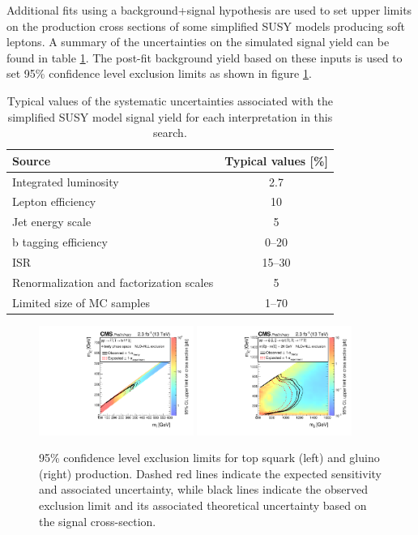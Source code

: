 Additional fits using a background+signal hypothesis are used to set upper limits on the production cross sections of some simplified SUSY models producing soft leptons. A summary of the uncertainties on the simulated signal yield can be found in table \ref{tbl:softsignalSyst}. The post-fit background yield based on these inputs is used to set 95\% confidence level exclusion limits as shown in figure \ref{fig:softlimits}.

\begin{table}
	\centering
	\renewcommand{\baselinestretch}{1.0}
	\caption{Typical values of the systematic uncertainties associated with the simplified SUSY model signal yield for each interpretation in this search.}
	\begin{tabular}{l|c}
\hline
Source & Typical values [\%]  \\
\hline
Integrated luminosity & 2.7  \\
Lepton efficiency & 10  \\
Jet energy scale & 5  \\
b tagging efficiency & 0--20  \\
ISR & 15--30  \\
Renormalization  and factorization scales & 5  \\
Limited size of MC samples & 1--70  \\
\hline
	\end{tabular}
	\label{tbl:softsignalSyst}
\end{table}
\begin{figure}
	\centering
	\includegraphics[width=0.45\textwidth]{soft/figs/T2-4bdXSEC}
	\includegraphics[width=0.45\textwidth]{soft/figs/T5qqqqWWXSEC}
	\renewcommand{\baselinestretch}{1.0}
	\caption[95\% confidence level exclusion limits for top squark (left) and gluino (right) production.]{95\% confidence level exclusion limits for top squark (left) and gluino (right) production. Dashed red lines indicate the expected sensitivity and associated uncertainty, while black lines indicate the observed exclusion limit and its associated theoretical uncertainty based on the signal cross-section.}
	\label{fig:softlimits}
\end{figure}

